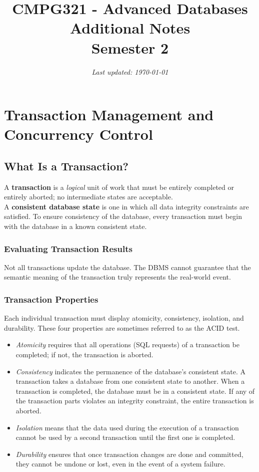\documentclass[a4paper, 11pt, titlepage]{report}
\begin{document}
\linespread{1.25}
\title{CMPG321 - Advanced Databases\\Additional Notes\\Semester 2}
\date{\textit{Last updated: \today}}
\maketitle
\tableofcontents{}

\chapter{Transaction Management and Concurrency Control}
\section{What Is a Transaction?}
A \textbf{transaction} is a \textit{logical} unit of work that must be entirely completed or entirely aborted; no intermediate states are acceptable.\\
A \textbf{consistent database state} is one in which all data integrity constraints are satisfied. To ensure consistency of the database, every transaction must begin with the database in a known consistent state.
\subsection{Evaluating Transaction Results}
Not all transactions update the database. The DBMS cannot guarantee that the semantic meaning of the transaction truly represents the real-world event.
\subsection{Transaction Properties}
Each individual transaction must display atomicity, consistency, isolation, and durability.
These four properties are sometimes referred to as the ACID test.
\begin{itemize}
\item \textit{Atomicity} requires that all operations (SQL requests) of a transaction be completed;
if not, the transaction is aborted.
\item \textit{Consistency} indicates the permanence of the database's consistent state. A transaction takes a database from one consistent state to another. When a transaction is completed, the database must be in a consistent state. If any of the transaction parts violates an integrity constraint, the entire transaction is aborted.
\item \textit{Isolation} means that the data used during the execution of a transaction cannot be used by a second transaction until the first one is completed.
\item \textit{Durability} ensures that once transaction changes are done and committed, they cannot be undone or lost, even in the event of a system failure.
\end{itemize}
\end{document}
